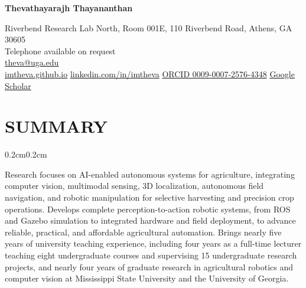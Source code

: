 \documentclass[10pt, letterpaper]{article}
\newenvironment{onecolentry}{%
    \begin{adjustwidth}{0.2cm}{0.2cm}
}{\end{adjustwidth}}
\begin{document}
\begin{center}
    {\fontsize{16pt}{18pt}\selectfont\bfseries Thevathayarajh Thayananthan}

    \vspace{0.10cm}

    Riverbend Research Lab North, Room 001E, 110 Riverbend Road, Athens, GA 30605 \\
    Telephone available on request \\
    \href{mailto:theva@uga.edu}{theva@uga.edu} \\
    \href{https://imtheva.github.io}{imtheva.github.io} \textbar{}
    \href{https://www.linkedin.com/in/imtheva}{linkedin.com/in/imtheva} \textbar{}
    \href{https://orcid.org/0009-0007-2576-4348}{ORCID 0009-0007-2576-4348} \textbar{}
    \href{https://scholar.google.com/citations?user=MpKhKEUAAAAJ}{Google Scholar}
\end{center}

\vspace{0.25cm}

\section{SUMMARY}
\vspace{0.06cm}
\begin{onecolentry}
    Research focuses on AI-enabled autonomous systems for agriculture, integrating
    computer vision, multimodal sensing, 3D localization, autonomous field navigation,
    and robotic manipulation for selective harvesting and precision crop operations.
    Develops complete perception-to-action robotic systems, from ROS and Gazebo
    simulation to integrated hardware and field deployment, to advance reliable,
    practical, and affordable agricultural automation.
    Brings nearly five years of university teaching experience, including four years
    as a full-time lecturer teaching eight undergraduate courses and supervising 15
    undergraduate research projects, and nearly four years of graduate research in
    agricultural robotics and computer vision at Mississippi State University and the
    University of Georgia.
\end{onecolentry}
\vspace{0.10cm}
\end{document}
